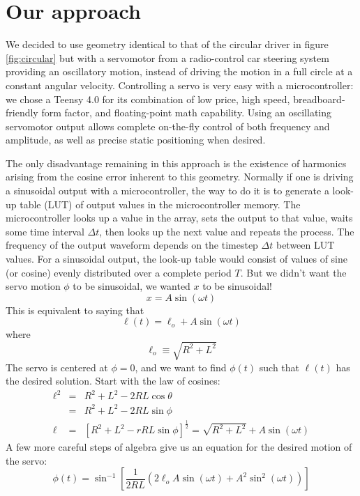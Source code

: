 \documentclass[prb,preprint]{revtex4-1}
\begin{document}
\section{Our approach}
We decided to use geometry identical to that of the circular driver in figure \ref{fig:circular} but with a servomotor from a radio-control car steering system providing an oscillatory motion, instead of driving the motion in a full circle at a constant angular velocity. 
Controlling a servo is very easy with a microcontroller: we chose a Teensy 4.0 for its combination of low price, high speed, breadboard-friendly form factor, and floating-point math capability.
Using an oscillating servomotor output allows complete on-the-fly control of both frequency and amplitude, as well as precise static positioning when desired. 

The only disadvantage remaining in this approach is the existence of harmonics arising from the cosine error inherent to this geometry. 
Normally if one is driving a sinusoidal output with a microcontroller, the way to do it is to generate a look-up table (LUT) of output values in the microcontroller memory.
The microcontroller looks up a value in the array, sets the output to that value, waits some time interval $\Delta t$, then looks up the next value and repeats the process. 
The frequency of the output waveform depends on the timestep $\Delta t$ between LUT values.
For a sinusoidal output, the look-up table would consist of values of sine (or cosine) evenly distributed over a complete period $T$.
But we didn't want the servo motion $\phi$ to be sinusoidal, we wanted $x$ to be sinusoidal!
\[ x = A \sin(\omega t) \]
This is equivalent to saying that
\[ \ell(t) = \ell_o + A \sin(\omega t) \]
where 
\[ \ell_o \equiv \sqrt{R^2+L^2} \]
The servo is centered at $\phi=0$, and we want to find $\phi(t)$ such that $\ell(t)$ has the desired solution.
Start with the law of cosines:
\begin{eqnarray*} 
	\ell^2 &=& R^2 + L^2 - 2 R L \cos\theta\\
		&=& R^2 + L^2 - 2 R L \sin\phi\\
	\ell &=& \left[ R^2+L^2 - r R L \sin\phi \right]^{\frac{1}{2}} = \sqrt{R^2+L^2} + A \sin(\omega t)
\end{eqnarray*}
A few more careful steps of algebra give us an equation for the desired motion of the servo:
\begin{equation} \label{eq:phi}
	\phi(t) = \sin^{-1} \left[\frac{1}{2RL}\left(2\ell_o A\sin(\omega t) + A^2 \sin^2(\omega t)\right)\right]
\end{equation}
\end{document}
